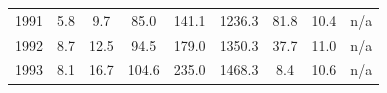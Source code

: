 \documentclass[openany]{book}
\begin{document}
\begin{table}[htbp]
{\begin{tabular}{ccccccccc}
\rowcolor[HTML]{F8F9FA} 
{\color[HTML]{202122} 1991}        & {\color[HTML]{202122} 5.8}                                                                  & {\color[HTML]{202122} 9.7}                                                                          & {\color[HTML]{202122} 85.0}                                                                     & {\color[HTML]{202122} 141.1}                                                                               & {\color[HTML]{202122} 1236.3}                                                                          & {\color[HTML]{202122} 81.8}                                                                           & {\color[HTML]{202122} 10.4}                                                                              & {\color[HTML]{202122} n/a}                                                                               \\
\rowcolor[HTML]{F8F9FA} 
{\color[HTML]{202122} 1992}        & {\color[HTML]{202122} 8.7}                                                                  & {\color[HTML]{202122} 12.5}                                                                         & {\color[HTML]{202122} 94.5}                                                                     & {\color[HTML]{202122} 179.0}                                                                               & {\color[HTML]{202122} 1350.3}                                                                          & {\color[HTML]{202122} 37.7}                                                                           & {\color[HTML]{202122} 11.0}                                                                              & {\color[HTML]{202122} n/a}                                                                               \\
\rowcolor[HTML]{F8F9FA} 
{\color[HTML]{202122} 1993}        & {\color[HTML]{202122} 8.1}                                                                  & {\color[HTML]{202122} 16.7}                                                                         & {\color[HTML]{202122} 104.6}                                                                    & {\color[HTML]{202122} 235.0}                                                                               & {\color[HTML]{202122} 1468.3}                                                                          & {\color[HTML]{202122} 8.4}                                                                            & {\color[HTML]{202122} 10.6}                                                                              & {\color[HTML]{202122} n/a}                                                                               \\

\end{tabular}}
\end{table}
\end{document}
